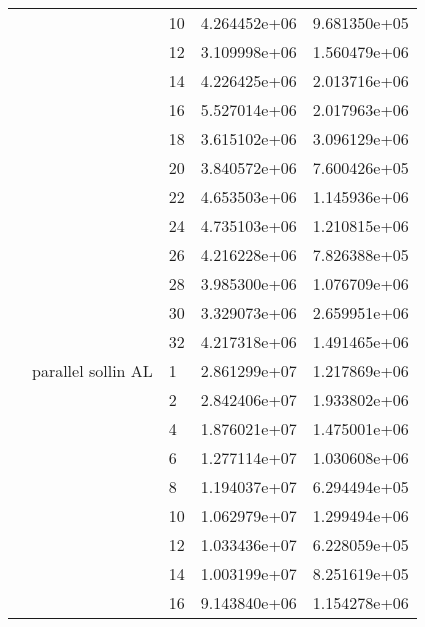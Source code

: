 \begin{tabular}{lllrr}
                      &                     & 10 &  4.264452e+06 &  9.681350e+05 \\
                      &                     & 12 &  3.109998e+06 &  1.560479e+06 \\
                      &                     & 14 &  4.226425e+06 &  2.013716e+06 \\
                      &                     & 16 &  5.527014e+06 &  2.017963e+06 \\
                      &                     & 18 &  3.615102e+06 &  3.096129e+06 \\
                      &                     & 20 &  3.840572e+06 &  7.600426e+05 \\
                      &                     & 22 &  4.653503e+06 &  1.145936e+06 \\
                      &                     & 24 &  4.735103e+06 &  1.210815e+06 \\
                      &                     & 26 &  4.216228e+06 &  7.826388e+05 \\
                      &                     & 28 &  3.985300e+06 &  1.076709e+06 \\
                      &                     & 30 &  3.329073e+06 &  2.659951e+06 \\
                      &                     & 32 &  4.217318e+06 &  1.491465e+06 \\
                      & parallel sollin AL & 1  &  2.861299e+07 &  1.217869e+06 \\
                      &                     & 2  &  2.842406e+07 &  1.933802e+06 \\
                      &                     & 4  &  1.876021e+07 &  1.475001e+06 \\
                      &                     & 6  &  1.277114e+07 &  1.030608e+06 \\
                      &                     & 8  &  1.194037e+07 &  6.294494e+05 \\
                      &                     & 10 &  1.062979e+07 &  1.299494e+06 \\
                      &                     & 12 &  1.033436e+07 &  6.228059e+05 \\
                      &                     & 14 &  1.003199e+07 &  8.251619e+05 \\
                      &                     & 16 &  9.143840e+06 &  1.154278e+06 \\

\end{tabular}
